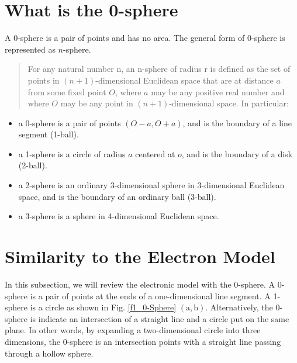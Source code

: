 \documentclass[
 reprint,
 amsmath,amssymb,
 aps,
]{revtex4-1}
\numberwithin{equation}{section}%
\begin{document}
\section{What is the 0-sphere}

    A 0-sphere is a pair of points and has no area. The general form of 0-sphere is represented as $n$-sphere.


    \begin{quote}
        For any natural number n, an n-sphere of radius r is defined as the set of points in $(n + 1)$-dimensional Euclidean space that are at distance $a$ from some fixed point $O$, where $a$ may be any positive real number and where $O$ may be any point in $(n + 1)$-dimensional space. In particular:
    \end{quote}
    
    \begin{itemize}
        \item a 0-sphere is a pair of points $(O - a, O + a)$, and is the boundary of a line segment (1-ball).
        \item a 1-sphere is a circle of radius $a$ centered at $o$, and is the boundary of a disk (2-ball).
        \item a 2-sphere is an ordinary 3-dimensional sphere in 3-dimensional Euclidean space, and is the boundary of an ordinary ball (3-ball).
        \item a 3-sphere is a sphere in 4-dimensional Euclidean space.
    \end{itemize}


\section{
    \label{sec:Review the electron model with 0-sphere}Similarity to the Electron Model}

    In this subsection, we will review the electronic model with the 0-sphere. A 0-sphere is a pair of points at the ends of a one-dimensional line segment. A 1-sphere is a circle as shown in Fig. \ref{f1_0-Sphere} $(\bm{\mathrm{a}}, \bm{\mathrm{b}})$. Alternatively, the 0-sphere is indicate an intersection of a straight line and a circle put on the same plane. In other words, by expanding a two-dimensional circle into three dimensions, the 0-sphere is an intersection points with a straight line passing through a hollow sphere.
\end{document}
